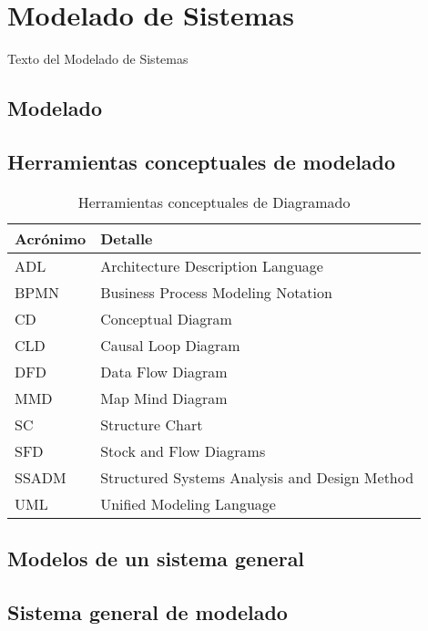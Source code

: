 
\chapter{Modelado de Sistemas}

Texto del Modelado de Sistemas

\section{Modelado}
\section{Herramientas conceptuales de modelado}

\begin{table}[h]
\centering
\caption{Herramientas conceptuales de Diagramado}
\label{my-label}
\begin{tabular}{|l|l|}
\hline
Acrónimo & Detalle                                       \\ \hline
ADL      & Architecture Description Language             \\ \hline
BPMN     & Business Process Modeling Notation            \\ \hline
CD       & Conceptual Diagram                            \\ \hline
CLD      & Causal Loop Diagram                           \\ \hline
DFD      & Data Flow Diagram                             \\ \hline
MMD      & Map Mind Diagram                              \\ \hline
SC       & Structure Chart                               \\ \hline
SFD      & Stock and Flow Diagrams                       \\ \hline
SSADM    & Structured Systems Analysis and Design Method \\ \hline
UML      & Unified Modeling Language                     \\ \hline
\end{tabular}
\end{table}

\section{Modelos de un sistema general}
\section{Sistema general de modelado}

